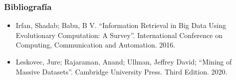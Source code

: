 \documentclass[
10pt, %
aspectratio=169, %
]{beamer}
\begin{document}
	\begin{frame}
		
		\frametitle{Bibliografía}
		
		\begin{itemize}
			
			\item Irfan, Shadab; Babu, B V. ``Information Retrieval in Big Data Using Evolutionary Computation: A Survey''. International Conference on Computing, Communication and Automation. 2016. \\[4mm]
			
			\item Leskovec, Jure; Rajaraman, Anand; Ullman, Jeffrey David; ``Mining of Massive Datasets''. Cambridge University Press. Third Edition. 2020. 
			
		\end{itemize}
		
	\end{frame}
	
	\begin{frame}
		\titlepage
	\end{frame}
	
	
	
\end{document}
